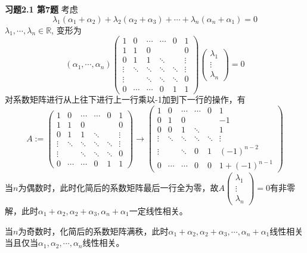 {\bf 习题2.1 第7题} 考虑
$$\lambda_1 (\alpha_1+\alpha_2) + \lambda_2 (\alpha_2+\alpha_3) + \cdots + \lambda_n (\alpha_n+\alpha_1) = 0$$
$\lambda_1, \cdots, \lambda_n\in\mathbb{R}$, 变形为
$$(\alpha_1, \cdots, \alpha_n)
\begin{pmatrix}
1 & 0 & \cdots & \cdots & 0 & 1 \\
1 & 1 & 0 & & & 0 \\
0 & 1 & 1 & \ddots & & \vdots \\
\vdots & \ddots & \ddots & \ddots & \ddots & \vdots \\
\vdots & & \ddots & \ddots & \ddots & 0 \\
0 & \cdots & \cdots & 0 & 1 & 1
\end{pmatrix}
\begin{pmatrix}
\lambda_1 \\ \vdots \\ \lambda_n
\end{pmatrix} = 0
$$
对系数矩阵进行从上往下进行上一行乘以-1加到下一行的操作，有
$$
A := \begin{pmatrix}
1 & 0 & \cdots & \cdots & 0 & 1 \\
1 & 1 & 0 & & & 0 \\
0 & 1 & 1 & \ddots & & \vdots \\
\vdots & \ddots & \ddots & \ddots & \ddots & \vdots \\
\vdots & & \ddots & \ddots & \ddots & 0 \\
0 & \cdots & \cdots & 0 & 1 & 1
\end{pmatrix}
\to
\begin{pmatrix}
1 & 0 & \cdots & \cdots & 0 & 1 \\
0 & 1 & 0 & & & -1 \\
0 & 0 & 1 & \ddots & & 1 \\
\vdots & \ddots & \ddots & \ddots & \ddots & \vdots \\
\vdots & & \ddots & 0 & 1 & (-1)^{n-2} \\
0 & \cdots & \cdots & 0 & 0 & 1 + (-1)^{n-1}
\end{pmatrix}
$$
当$n$为偶数时，此时化简后的系数矩阵最后一行全为零，故$A\begin{pmatrix}
\lambda_1 \\ \vdots \\ \lambda_n
\end{pmatrix} = 0$有非零解，此时$\alpha_1+\alpha_2, \alpha_2+\alpha_3, \alpha_n+\alpha_1$一定线性相关。

当$n$为奇数时，化简后的系数矩阵满秩，此时$\alpha_1+\alpha_2, \alpha_2+\alpha_3, \cdots, \alpha_n+\alpha_1$线性相关当且仅当$\alpha_1, \alpha_2, \cdots, \alpha_n$线性相关。


